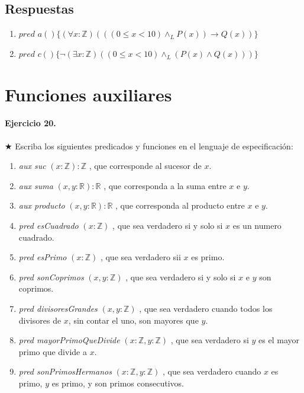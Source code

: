 \documentclass[a4paper]{article}
\begin{document}
\subsection*{Respuestas}
\begin{enumerate}[label=\alph*)]
\item $pred$ $a()\{(\forall x: \mathbb{Z})(((0 \leq x < 10)\wedge _L P(x))\rightarrow Q(x))\}$
\item $pred$ $c()\{\neg (\exists x: \mathbb{Z})((0 \leq x < 10)\wedge _L(P(x)\wedge Q(x)))\}$
\end{enumerate}
\section{Funciones auxiliares}

\paragraph{\textbf{Ejercicio 20.}} $\bigstar$ Escriba los siguientes predicados y funciones en el lenguaje de especificación:
\begin{enumerate}[label=\alph*)]
\item \textit{aux suc} $(x: \mathbb{Z}):\mathbb{Z}$ , que corresponde al sucesor de $x$.
\item \textit{aux suma} $(x,y: \mathbb{R}):\mathbb{R}$ , que corresponda a la suma entre $x$ e $y$.
\item \textit{aux producto} $(x,y: \mathbb{R}):\mathbb{R}$ , que corresponda al producto entre $x$ e $y$.
\item \textit{pred esCuadrado} $(x: \mathbb{Z})$ , que sea verdadero si y solo si $x$ es un numero cuadrado.
\item \textit{pred esPrimo} $(x: \mathbb{Z})$ , que sea verdadero sii $x$ es primo.
\item \textit{pred sonCoprimos} $(x,y: \mathbb{Z})$ , que sea verdadero si y solo si $x$ e $y$ son coprimos.
\item \textit{pred divisoresGrandes} $(x,y: \mathbb{Z})$ , que sea verdadero cuando todos los divisores de $x$, sin contar el uno, son mayores que $y$.
\item \textit{pred mayorPrimoQueDivide} $(x: \mathbb{Z},y: \mathbb{Z})$ , que sea verdadero si $y$ es el mayor primo que divide a $x$.
\item \textit{pred sonPrimosHermanos} $(x: \mathbb{Z},y: \mathbb{Z})$ , que sea verdadero cuando $x$ es primo, $y$ es primo, y son primos consecutivos.
\end{enumerate}
\end{document}
